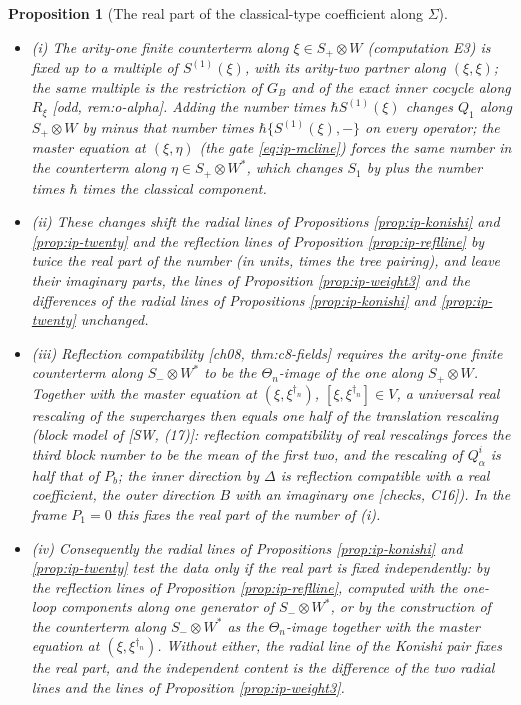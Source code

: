 \documentclass[11pt]{report}
\theoremstyle{plain}
\newtheorem{proposition}[theorem]{Proposition}
\theoremstyle{definition}
\numberwithin{equation}{chapter}
\begin{document}
\begin{proposition}[The real part of the classical-type coefficient along $\Sigma$]
\label{prop:ip-realpart}
\begin{itemize}
\item (i) The arity-one finite counterterm along $\xi\in S_+\otimes W$ (computation E3) is fixed up to a multiple of $S^{(1)}(\xi)$, with its arity-two partner along $(\xi,\xi)$; the same multiple is the restriction of $G_B$ and of the exact inner cocycle along $R_\xi$ [odd, rem:o-alpha]. Adding the number times $\hbar S^{(1)}(\xi)$ changes $Q_1$ along $S_+\otimes W$ by minus that number times $\hbar\{S^{(1)}(\xi),-\}$ on every operator; the master equation at $(\xi,\eta)$ (the gate \eqref{eq:ip-mcline}) forces the same number in the counterterm along $\eta\in S_+\otimes W^*$, which changes $S_1$ by plus the number times $\hbar$ times the classical component.
\item (ii) These changes shift the radial lines of Propositions \ref{prop:ip-konishi} and \ref{prop:ip-twenty} and the reflection lines of Proposition \ref{prop:ip-reflline} by twice the real part of the number (in units, times the tree pairing), and leave their imaginary parts, the lines of Proposition \ref{prop:ip-weight3} and the differences of the radial lines of Propositions \ref{prop:ip-konishi} and \ref{prop:ip-twenty} unchanged.
\item (iii) Reflection compatibility [ch08, thm:c8-fields] requires the arity-one finite counterterm along $S_-\otimes W^*$ to be the $\Theta_n$-image of the one along $S_+\otimes W$. Together with the master equation at $(\xi,\xi^{\dagger_n})$, $[\xi,\xi^{\dagger_n}]\in V$, a universal real rescaling of the supercharges then equals one half of the translation rescaling (block model of [SW, (17)]: reflection compatibility of real rescalings forces the third block number to be the mean of the first two, and the rescaling of $Q^i_\alpha$ is half that of $P_b$; the inner direction by $\Delta$ is reflection compatible with a real coefficient, the outer direction $B$ with an imaginary one [checks, C16]). In the frame $P_1=0$ this fixes the real part of the number of (i).
\item (iv) Consequently the radial lines of Propositions \ref{prop:ip-konishi} and \ref{prop:ip-twenty} test the data only if the real part is fixed independently: by the reflection lines of Proposition \ref{prop:ip-reflline}, computed with the one-loop components along one generator of $S_-\otimes W^*$, or by the construction of the counterterm along $S_-\otimes W^*$ as the $\Theta_n$-image together with the master equation at $(\xi,\xi^{\dagger_n})$. Without either, the radial line of the Konishi pair fixes the real part, and the independent content is the difference of the two radial lines and the lines of Proposition \ref{prop:ip-weight3}.

\end{itemize}
\end{proposition}
\end{document}
